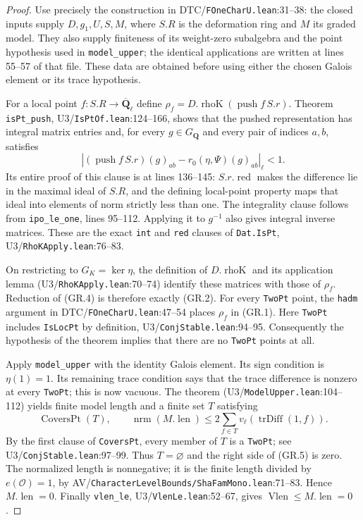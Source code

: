 \begin{proof}
Use precisely the construction in
DTC/\texttt{FOneCharU.lean}:31--38: the closed inputs supply
$D,g_1,U,S,M$, where $S.R$ is the deformation ring and $M$
its graded model. They also supply finiteness of its
weight-zero subalgebra and the point hypothesis used in
\texttt{model\_upper}; the identical applications are written
at lines 55--57 of that file. These data are obtained before
using either the chosen Galois element or its trace hypothesis.

For a local point $f:S.R\to\overline{\mathbf Q}_\ell$ define
$\rho_f=D.\operatorname{rhoK}(\operatorname{push}f\,S.r)$.
Theorem \texttt{isPt\_push}, U3/\texttt{IsPtOf.lean}:124--166,
shows that the pushed representation has integral matrix
entries and, for every $g\in G_{\mathbf Q}$ and every pair of
indices $a,b$, satisfies
\[
 \left| (\operatorname{push}f\,S.r)(g)_{ab}
              -r_0(\eta,\Psi)(g)_{ab}\right|_\ell<1.
                                                               \tag{GR.4}
\]
Its entire proof of this clause is at lines 136--145:
$S.r.\operatorname{red}$ makes the difference lie in the
maximal ideal of $S.R$, and the defining local-point property
maps that ideal into elements of norm strictly less than one.
The integrality clause follows from \texttt{ipo\_le\_one},
lines 95--112. Applying it to $g^{-1}$ also gives integral
inverse matrices. These are the exact \texttt{int} and
\texttt{red} clauses of \texttt{Dat.IsPt},
U3/\texttt{RhoKApply.lean}:76--83.

On restricting to $G_K=\ker\eta$, the definition of
$D.\operatorname{rhoK}$ and its application lemma
(U3/\texttt{RhoKApply.lean}:70--74) identify these matrices
with those of $\rho_f$. Reduction of (GR.4) is therefore
exactly (GR.2). For every \texttt{TwoPt} point, the
\texttt{hadm} argument in DTC/\texttt{FOneCharU.lean}:47--54
places $\rho_f$ in (GR.1). Here \texttt{TwoPt} includes
\texttt{IsLocPt} by definition,
U3/\texttt{ConjStable.lean}:94--95.
Consequently the hypothesis of the theorem implies that
there are no \texttt{TwoPt} points at all.

Apply \texttt{model\_upper} with the identity Galois element.
Its sign condition is $\eta(1)=1$. Its remaining trace
condition says that the trace difference is nonzero at
every \texttt{TwoPt}; this is now vacuous. The theorem
(U3/\texttt{ModelUpper.lean}:104--112) yields finite model
length and a finite set $T$ satisfying
\[
 \operatorname{CoversPt}(T),\qquad
 \operatorname{nrm}(M.\operatorname{len})
       \leq2\sum_{f\in T}v_\ell(\operatorname{trDiff}(1,f)).
                                                               \tag{GR.5}
\]
By the first clause of \texttt{CoversPt}, every member of
$T$ is a \texttt{TwoPt}; see U3/\texttt{ConjStable.lean}:97--99.
Thus $T=\varnothing$ and the right side of (GR.5) is zero.
The normalized length is nonnegative; it is the finite
length divided by $e(\mathcal O)=1$, by
AV/\texttt{CharacterLevelBounds/ShaFamMono.lean}:71--83.
Hence $M.\operatorname{len}=0$. Finally
\texttt{vlen\_le}, U3/\texttt{VlenLe.lean}:52--67,
gives $\operatorname{Vlen}\leq M.\operatorname{len}=0$.
\end{proof}

